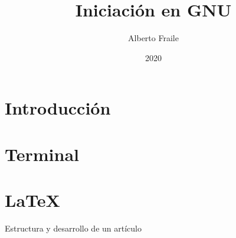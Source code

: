 \documentclass[a4paper, 11pt, titlepage]{report}
\title{Iniciación en GNU}
\author{Alberto Fraile}
\date{2020}
\begin{document}
\maketitle
\tableofcontents
\newpage

\chapter*{Introducción}
\chapter{Terminal}
\chapter{LaTeX}
\begin{section}{Estructura y desarrollo de un artículo}\end{section}
\end{document}
